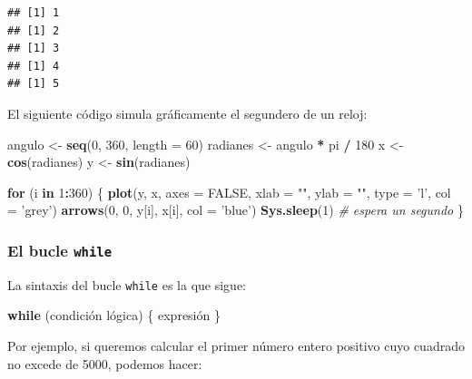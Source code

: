 \documentclass[]{book}
\newenvironment{Shaded}{\begin{snugshade}}{\end{snugshade}}
\newcommand{\CommentTok}[1]{\textcolor[rgb]{0.56,0.35,0.01}{\textit{#1}}}
\newcommand{\ControlFlowTok}[1]{\textcolor[rgb]{0.13,0.29,0.53}{\textbf{#1}}}
\newcommand{\DataTypeTok}[1]{\textcolor[rgb]{0.13,0.29,0.53}{#1}}
\newcommand{\DecValTok}[1]{\textcolor[rgb]{0.00,0.00,0.81}{#1}}
\newcommand{\KeywordTok}[1]{\textcolor[rgb]{0.13,0.29,0.53}{\textbf{#1}}}
\newcommand{\NormalTok}[1]{#1}
\newcommand{\OperatorTok}[1]{\textcolor[rgb]{0.81,0.36,0.00}{\textbf{#1}}}
\newcommand{\OtherTok}[1]{\textcolor[rgb]{0.56,0.35,0.01}{#1}}
\newcommand{\StringTok}[1]{\textcolor[rgb]{0.31,0.60,0.02}{#1}}
\begin{document}
\begin{verbatim}
## [1] 1
## [1] 2
## [1] 3
## [1] 4
## [1] 5
\end{verbatim}

El siguiente código simula gráficamente el segundero de un
reloj:

\begin{Shaded}
\begin{Highlighting}[]
\NormalTok{angulo <-}\StringTok{ }\KeywordTok{seq}\NormalTok{(}\DecValTok{0}\NormalTok{, }\DecValTok{360}\NormalTok{, }\DataTypeTok{length =} \DecValTok{60}\NormalTok{)}
\NormalTok{radianes <-}\StringTok{ }\NormalTok{angulo }\OperatorTok{*}\StringTok{ }\NormalTok{pi }\OperatorTok{/}\StringTok{ }\DecValTok{180}
\NormalTok{x <-}\StringTok{ }\KeywordTok{cos}\NormalTok{(radianes)}
\NormalTok{y <-}\StringTok{ }\KeywordTok{sin}\NormalTok{(radianes)}

\ControlFlowTok{for}\NormalTok{ (i }\ControlFlowTok{in} \DecValTok{1}\OperatorTok{:}\DecValTok{360}\NormalTok{) \{}
  \KeywordTok{plot}\NormalTok{(y, x, }\DataTypeTok{axes =} \OtherTok{FALSE}\NormalTok{, }\DataTypeTok{xlab =} \StringTok{""}\NormalTok{, }\DataTypeTok{ylab =} \StringTok{""}\NormalTok{, }\DataTypeTok{type =} \StringTok{'l'}\NormalTok{, }\DataTypeTok{col =} \StringTok{'grey'}\NormalTok{)}
  \KeywordTok{arrows}\NormalTok{(}\DecValTok{0}\NormalTok{, }\DecValTok{0}\NormalTok{, y[i], x[i], }\DataTypeTok{col =} \StringTok{'blue'}\NormalTok{)}
  \KeywordTok{Sys.sleep}\NormalTok{(}\DecValTok{1}\NormalTok{) }\CommentTok{# espera un segundo}
\NormalTok{\}}
\end{Highlighting}
\end{Shaded}

\hypertarget{el-bucle-while}{%
\subsubsection{\texorpdfstring{El bucle \texttt{while}}{El bucle while}}\label{el-bucle-while}}

La sintaxis del bucle \texttt{while}
es la que sigue:

\begin{Shaded}
\begin{Highlighting}[]
\ControlFlowTok{while}\NormalTok{ (condición lógica)  \{ expresión \}}
\end{Highlighting}
\end{Shaded}

Por ejemplo, si queremos calcular el primer número entero positivo cuyo
cuadrado no excede de 5000, podemos hacer:
\end{document}
